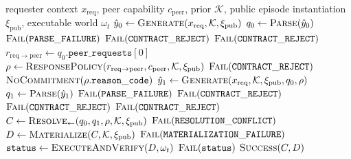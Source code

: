 \documentclass[10pt]{article}
\begin{document}
\begin{algorithm}[!htbp]
  \caption{Bounded feedback resolution}
  \label{alg:feedback}
  \footnotesize
  \begin{algorithmic}[1]
    \Require requester context $x_{\mathrm{req}}$, peer capability $c_{\mathrm{peer}}$, prior $\mathcal K$, public episode instantiation $\xi_{\mathrm{pub}}$, executable world $\omega_t$
    \State $\hat y_0 \gets \textsc{Generate}(x_{\mathrm{req}},\mathcal K,\xi_{\mathrm{pub}})$
    \State $q_0 \gets \textsc{Parse}(\hat y_0)$
     \State \Return $\textsc{Fail}(\mathtt{PARSE\_FAILURE})$ \EndIf
      \State \Return $\textsc{Fail}(\mathtt{CONTRACT\_REJECT})$
    \EndIf
      \State \Return $\textsc{Fail}(\mathtt{CONTRACT\_REJECT})$
    \EndIf
    \State $r_{\mathrm{req}\rightarrow\mathrm{peer}}\gets q_0.\mathtt{peer\_requests}[0]$
    \State $\rho \gets \textsc{ResponsePolicy}(r_{\mathrm{req}\rightarrow\mathrm{peer}},c_{\mathrm{peer}},\mathcal K,\xi_{\mathrm{pub}})$
      \State \Return $\textsc{Fail}(\mathtt{CONTRACT\_REJECT})$
    \EndIf
      \State \Return $\textsc{NoCommitment}(\rho.\mathtt{reason\_code})$
    \EndIf
    \State $\hat y_1 \gets \textsc{Generate}(x_{\mathrm{req}},\mathcal K,\xi_{\mathrm{pub}},q_0,\rho)$ 
    \State $q_1 \gets \textsc{Parse}(\hat y_1)$
     \State \Return $\textsc{Fail}(\mathtt{PARSE\_FAILURE})$ \EndIf
      \State \Return $\textsc{Fail}(\mathtt{CONTRACT\_REJECT})$
    \EndIf
      \State \Return $\textsc{Fail}(\mathtt{CONTRACT\_REJECT})$
    \EndIf
      \State \Return $\textsc{Fail}(\mathtt{CONTRACT\_REJECT})$
    \EndIf
    \State $C \gets \textsc{Resolve}_{\leftarrow}(q_0,q_1,\rho,\mathcal K,\xi_{\mathrm{pub}})$
     \State \Return $\textsc{Fail}(\mathtt{RESOLUTION\_CONFLICT})$ \EndIf
    \State $D \gets \textsc{Materialize}(C,\mathcal K,\xi_{\mathrm{pub}})$
     \State \Return $\textsc{Fail}(\mathtt{MATERIALIZATION\_FAILURE})$ \EndIf
    \State $\mathtt{status}\gets\textsc{ExecuteAndVerify}(D,\omega_t)$
     \State \Return $\textsc{Fail}(\mathtt{status})$ \EndIf
    \State \Return $\textsc{Success}(C,D)$
  \end{algorithmic}
\end{algorithm}
\FloatBarrier
\end{document}
